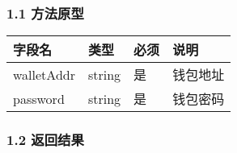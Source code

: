 \documentclass[letterpaper,10pt,english]{sphinxmanual}
\begin{document}
\subsubsection{1.1 方法原型}
\label{\detokenize{BCBWalletSDK_u63a5_u53e3_u8bf4_u660e:id57}}



\begin{savenotes}\sphinxattablestart
\centering
\begin{tabulary}{\linewidth}[t]{|T|T|T|T|}
\hline
\sphinxstyletheadfamily 
字段名
&\sphinxstyletheadfamily 
类型
&\sphinxstyletheadfamily 
必须
&\sphinxstyletheadfamily 
说明
\\
\hline
walletAddr
&
string
&
是
&
钱包地址
\\
\hline
password
&
string
&
是
&
钱包密码
\\
\hline
\end{tabulary}
\par
\sphinxattableend\end{savenotes}


\subsubsection{1.2 返回结果}
\label{\detokenize{BCBWalletSDK_u63a5_u53e3_u8bf4_u660e:id58}}

\begin{sphinxVerbatim}[commandchars=\\\{\}]
     
     
\end{sphinxVerbatim}


\begin{sphinxVerbatim}[commandchars=\\\{\}]
     
\end{sphinxVerbatim}
\end{document}
